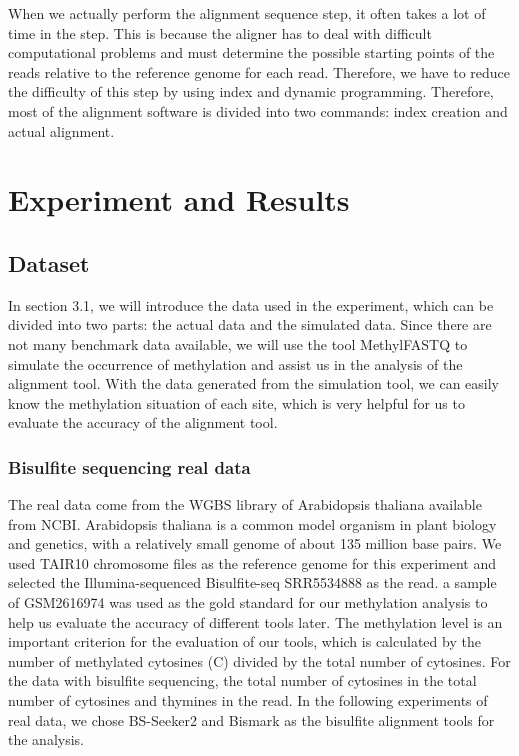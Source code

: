 \documentclass{PHlab-thesis}
\begin{document}
When we actually perform the alignment sequence step, it often takes a lot of time in the step. This is because the aligner has to deal with difficult computational problems and must determine the possible starting points of the reads relative to the reference genome for each read. Therefore, we have to reduce the difficulty of this step by using index and dynamic programming. Therefore, most of the alignment software is divided into two commands: index creation and actual alignment.

\chapter{Experiment and Results}
\section{Dataset}
In section 3.1, we will introduce the data used in the experiment, which can be divided into two parts: the actual data and the simulated data. Since there are not many benchmark data available, we will use the tool MethylFASTQ to simulate the occurrence of methylation and assist us in the analysis of the alignment tool. With the data generated from the simulation tool, we can easily know the methylation situation of each site, which is very helpful for us to evaluate the accuracy of the alignment tool.

\subsection{Bisulfite sequencing real data}
The real data come from the WGBS library of Arabidopsis thaliana available from NCBI. Arabidopsis thaliana is a common model organism in plant biology and genetics, with a relatively small genome of about 135 million base pairs. We used TAIR10 chromosome files as the reference genome for this experiment and selected the Illumina-sequenced Bisulfite-seq SRR5534888 as the read. a sample of GSM2616974 was used as the gold standard for our methylation analysis to help us evaluate the accuracy of different tools later. The methylation level is an important criterion for the evaluation of our tools, which is calculated by the number of methylated cytosines (C) divided by the total number of cytosines. For the data with bisulfite sequencing, the total number of cytosines in the total number of cytosines and thymines in the read. In the following experiments of real data, we chose BS-Seeker2 and Bismark as the bisulfite alignment tools for the analysis.
\end{document}
